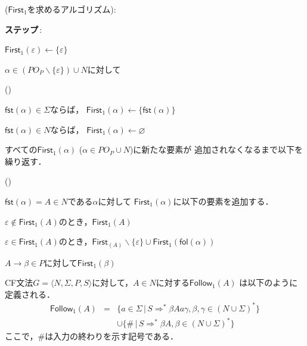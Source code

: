 \documentclass[a4j,dvipdfmx]{jbook}
\begin{document}
\begin{Alg}\mbox{\rm ($\mathsf{First}_1$を求めるアルゴリズム):}
  \begin{list}{{\bf ステップ}\,{\rm{}:}}{}
    \item $\mathsf{First}_1(\varepsilon)\leftarrow\{\varepsilon\}$
    \item $\alpha\in (PO_P\backslash\{\varepsilon\})\cup N$に対して
    \begin{list}{()}{}
      \item $\mathsf{fst}(\alpha)\in\Sigma$ならば，
      $\mathsf{First}_1(\alpha)\leftarrow \{\mathsf{fst}(\alpha)\}$
      \item $\mathsf{fst}(\alpha)\in N$ならば，
      $\mathsf{First}_1(\alpha)\leftarrow \varnothing$
    \end{list}
    \item すべての$\mathsf{First}_1(\alpha)$ ($\alpha\in PO_P\cup N$)に新たな要素が
    追加されなくなるまで以下を繰り返す．
    \begin{list}{()}{}
      \item $\mathsf{fst}(\alpha)=A\in N$である$\alpha$に対して
      $\mathsf{First}_1(\alpha)$に以下の要素を追加する．
      \begin{list}{}{}
        \item $\varepsilon\notin\mathsf{First}_1(A)$のとき，$\mathsf{First}_1(A)$
        \item $\varepsilon\in\mathsf{First}_1(A)$のとき，$\mathsf{First}_(A)\backslash\{\varepsilon\}\cup\mathsf{First}_1(\mathsf{fol}(\alpha))$
      \end{list}
    \item $A\rightarrow\beta\in P$に対して$\mathsf{First}_1(\beta)$
    \end{list}
  \end{list}
\end{Alg}

\begin{Def}
  CF文法$G=\langle N,\Sigma,P,S\rangle$に対して，$A\in N$に対する$\mathsf{Follow}_1(A)$
  は以下のように定義される．
  \[\begin{array}{rcl}
  \mathsf{Follow}_1(A) & = & \{a\in\Sigma\,|\,S\Rightarrow^\ast\beta Aa\gamma,\beta,\gamma\in(N\cup\Sigma)^\ast\}\\
  & & \cup\{\#\,|\,S\Rightarrow^\ast\beta A, \beta\in(N\cup\Sigma)^\ast\}
  \end{array}
  \]
  ここで，$\#$は入力の終わりを示す記号である．
\end{Def}
\end{document}
